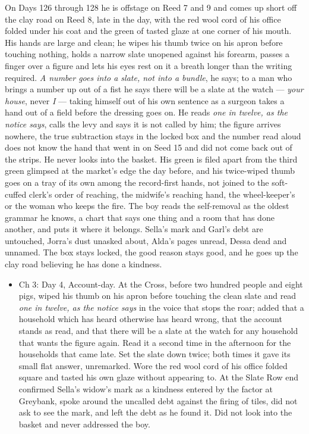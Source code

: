 \documentclass{design/chronicle}
\begin{document}
{On Days 126 through 128 he is offstage on Reed 7 and 9 and comes up short off the clay road on Reed 8, late in the day, with the red wool cord of his office folded under his coat and the green of tasted glaze at one corner of his mouth. His hands are large and clean; he wipes his thumb twice on his apron before touching nothing, holds a narrow slate unopened against his forearm, passes a finger over a figure and lets his eyes rest on it a breath longer than the writing required. \emph{A number goes into a slate, not into a bundle}, he says; to a man who brings a number up out of a fist he says there will be a slate at the watch — \emph{your house}, never \emph{I} — taking himself out of his own sentence as a surgeon takes a hand out of a field before the dressing goes on. He reads \emph{one in twelve, as the notice says}, calls the levy and says it is not called by him; the figure arrives nowhere, the true subtraction stays in the locked box and the number read aloud does not know the hand that went in on Seed 15 and did not come back out of the strips. He never looks into the basket. His green is filed apart from the third green glimpsed at the market’s edge the day before, and his twice-wiped thumb goes on a tray of its own among the record-first hands, not joined to the soft-cuffed clerk’s order of reaching, the midwife’s reaching hand, the wheel-keeper’s or the woman who keeps the fire. The boy reads the self-removal as the oldest grammar he knows, a chart that says one thing and a room that has done another, and puts it where it belongs. Sella’s mark and Garl’s debt are untouched, Jorra’s dust unasked about, Alda’s pages unread, Dessa dead and unnamed. The box stays locked, the good reason stays good, and he goes up the clay road believing he has done a kindness.

\begin{itemize}[leftmargin=1.4em,itemsep=1pt,topsep=3pt,parsep=0pt]

\item Ch 3: Day 4, Account-day. At the Cross, before two hundred people and eight pigs, wiped his thumb on his apron before touching the clean slate and read \emph{one in twelve, as the notice says} in the voice that stops the roar; added that a household which has heard otherwise has heard wrong, that the account stands as read, and that there will be a slate at the watch for any household that wants the figure again. Read it a second time in the afternoon for the households that came late. Set the slate down twice; both times it gave its small flat answer, unremarked. Wore the red wool cord of his office folded square and tasted his own glaze without appearing to. At the Slate Row end confirmed Sella’s widow’s mark as a kindness entered by the factor at Greybank, spoke around the uncalled debt against the firing of tiles, did not ask to see the mark, and left the debt as he found it. Did not look into the basket and never addressed the boy.


\end{itemize}}
\end{document}
